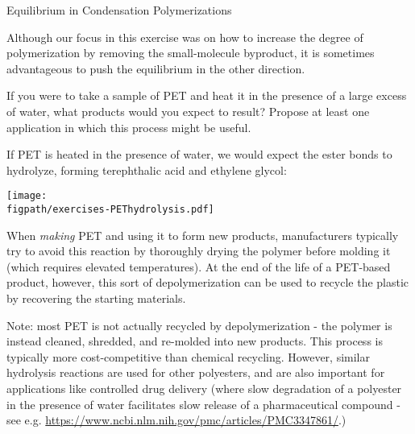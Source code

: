 \begin{activity}{Equilibrium in Condensation Polymerizations}
\begin{exercises}
\begin{enumerate}
\begin{solution}{}
				\end{solution}
			
			\end{enumerate}
		
		\exercise Although our focus in this exercise was on how to increase the degree of polymerization by removing the small-molecule byproduct, it is sometimes advantageous to push the equilibrium in the other direction.
		
			If you were to take a sample of PET and heat it in the presence of a large excess of water, what products would you expect to result?  Propose at least one application in which this process might be useful.
		
			\begin{solution}{}
				If PET is heated in the presence of water, we would expect the ester bonds to hydrolyze, forming terephthalic acid and ethylene glycol:
		
		\centerline{\texttt{[image: \\figpath/exercises-PEThydrolysis.pdf]}}
				
				When \emph{making} PET and using it to form new products, manufacturers typically try to avoid this reaction by thoroughly drying the polymer before molding it (which requires elevated temperatures). At the end of the life of a PET-based product, however, this sort of depolymerization can be used to recycle the plastic by recovering the starting materials.
				
				Note: most PET is not actually recycled by depolymerization - the polymer is instead cleaned, shredded, and re-molded into new products.  This process is typically more cost-competitive than chemical recycling.  However, similar hydrolysis reactions are used for other polyesters, and are also important for applications like controlled drug delivery (where slow degradation of a polyester in the presence of water facilitates slow release of a pharmaceutical compound - see e.g. \url{https://www.ncbi.nlm.nih.gov/pmc/articles/PMC3347861/}.)
				
			\end{solution}
			
			
		
		
\end{exercises}
	
\end{activity}